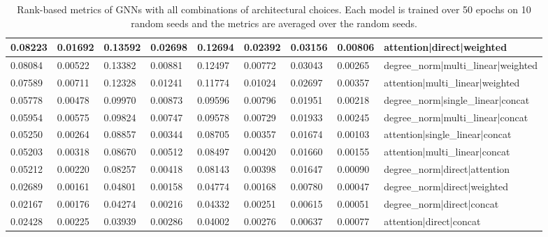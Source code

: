 \documentclass{article}
\begin{document}
\begin{table}
\begin{tabular}{lllllllll}
0.08223 & 0.01692     & 0.13592 & 0.02698   & 0.12694   & 0.02392        & 0.03156 & 0.00806  & attention|direct|weighted             \\ \hline
0.08084 & 0.00522     & 0.13382 & 0.00881   & 0.12497   & 0.00772        & 0.03043 & 0.00265  & degree\_norm|multi\_linear|weighted   \\ \hline
0.07589 & 0.00711     & 0.12328 & 0.01241   & 0.11774   & 0.01024        & 0.02697 & 0.00357  & attention|multi\_linear|weighted      \\ \hline
0.05778 & 0.00478     & 0.09970 & 0.00873   & 0.09596   & 0.00796        & 0.01951 & 0.00218  & degree\_norm|single\_linear|concat    \\ \hline
0.05954 & 0.00575     & 0.09824 & 0.00747   & 0.09578   & 0.00729        & 0.01933 & 0.00245  & degree\_norm|multi\_linear|concat     \\ \hline
0.05250 & 0.00264     & 0.08857 & 0.00344   & 0.08705   & 0.00357        & 0.01674 & 0.00103  & attention|single\_linear|concat       \\ \hline
0.05203 & 0.00318     & 0.08670 & 0.00512   & 0.08497   & 0.00420        & 0.01660 & 0.00155  & attention|multi\_linear|concat        \\ \hline
0.05212 & 0.00220     & 0.08257 & 0.00418   & 0.08143   & 0.00398        & 0.01647 & 0.00090  & degree\_norm|direct|attention         \\ \hline
0.02689 & 0.00161     & 0.04801 & 0.00158   & 0.04774   & 0.00168        & 0.00780 & 0.00047  & degree\_norm|direct|weighted          \\ \hline
0.02167 & 0.00176     & 0.04274 & 0.00216   & 0.04332   & 0.00251        & 0.00615 & 0.00051  & degree\_norm|direct|concat            \\ \hline
0.02428 & 0.00225     & 0.03939 & 0.00286   & 0.04002   & 0.00276        & 0.00637 & 0.00077  & attention|direct|concat               \\ \hline
\end{tabular}
\caption{Rank-based metrics of GNNs with all combinations of architectural choices. Each model is trained over 50 epochs on 10 random seeds and the metrics are averaged over the random seeds.}
\label{tab:full-metrics}
\end{table}
\end{document}
